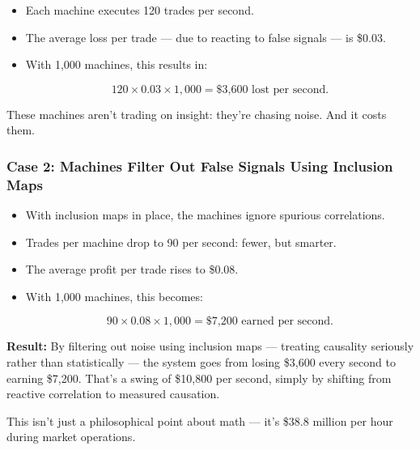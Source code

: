 \begin{itemize}
    \item Each machine executes 120 trades per second.
    \item The average loss per trade --- due to reacting to false signals --- is \$0.03.
    \item With 1,000 machines, this results in:

    \[
    120 \times 0.03 \times 1,000 = \text{\$3,600 lost per second}.
    \]
\end{itemize}

These machines aren't trading on insight: they’re chasing noise. And it costs them.

\subsubsection{Case 2: Machines Filter Out False Signals Using Inclusion Maps}

\begin{itemize}
    \item With inclusion maps in place, the machines ignore spurious correlations.
    \item Trades per machine drop to 90 per second: fewer, but smarter.
    \item The average profit per trade rises to \$0.08.
    \item With 1,000 machines, this becomes:

    \[
    90 \times 0.08 \times 1,000 = \text{\$7,200 earned per second}.
    \]
\end{itemize}

\textbf{Result:} By filtering out noise using inclusion maps — treating causality seriously rather than statistically — the system goes from losing \$3,600 every second to earning \$7,200. That’s a swing of \$10,800 per second, simply by shifting from reactive correlation to measured causation.

This isn’t just a philosophical point about math — it’s \$38.8 million per hour during market operations.


